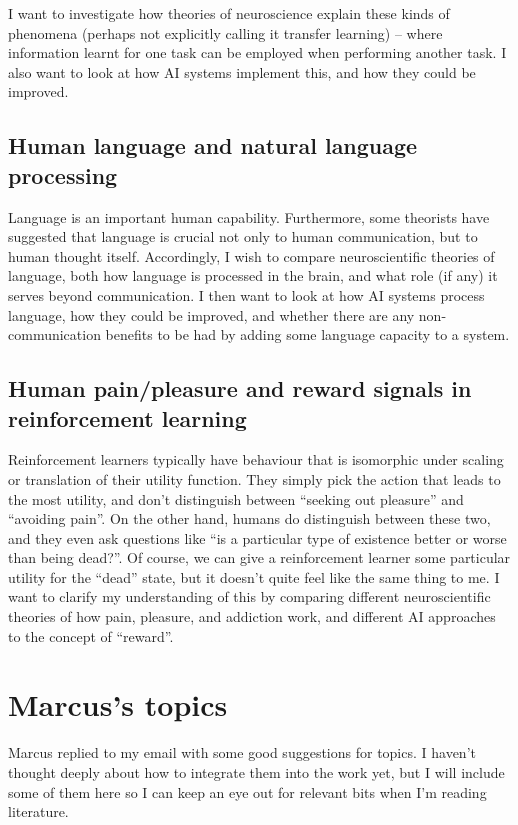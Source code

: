 \documentclass[10pt,a4paper]{article}
\newcommand{\nquote}[1]{``{#1}''}
\begin{document}
I want to investigate how theories of neuroscience explain these kinds of phenomena (perhaps not explicitly calling it transfer learning) -- where information learnt for one task can be employed when performing another task. I also want to look at how AI systems implement this, and how they could be improved.

\subsection{Human language and natural language processing}
Language is an important human capability. Furthermore, some theorists have suggested that language is crucial not only to human communication, but to human thought itself. Accordingly, I wish to compare neuroscientific theories of language, both how language is processed in the brain, and what role (if any) it serves beyond communication. I then want to look at how AI systems process language, how they could be improved, and whether there are any non-communication benefits to be had by adding some language capacity to a system.

\subsection{Human pain/pleasure and reward signals in reinforcement learning}
Reinforcement learners typically have behaviour that is isomorphic under scaling or translation of their utility function. They simply pick the action that leads to the most utility, and don't distinguish between \nquote{seeking out pleasure} and \nquote{avoiding pain}. On the other hand, humans do distinguish between these two, and they even ask questions like \nquote{is a particular type of existence better or worse than being dead?}. Of course, we can give a reinforcement learner some particular utility for the \nquote{dead} state, but it doesn't quite feel like the same thing to me. I want to clarify my understanding of this by comparing different neuroscientific theories of how pain, pleasure, and addiction work, and different AI approaches to the concept of \nquote{reward}.

\section{Marcus's topics}
Marcus replied to my email with some good suggestions for topics. I haven't thought deeply about how to integrate them into the work yet, but I will include some of them here so I can keep an eye out for relevant bits when I'm reading literature.
\end{document}
